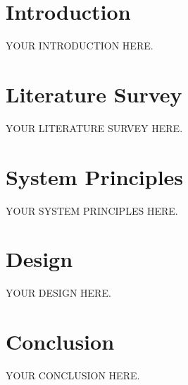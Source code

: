 \documentclass[12pt,a4paper,notitlepage,oneside]{article}
\begin{document}






\tableofcontents
\clearpage
\listoffigures




\clearpage
\section{Introduction}

YOUR INTRODUCTION HERE.
\clearpage


\clearpage
\section{Literature Survey}

YOUR LITERATURE SURVEY HERE.
\clearpage


\clearpage
\section{System Principles}

YOUR SYSTEM PRINCIPLES HERE.
\clearpage


\clearpage
\section{Design}

YOUR DESIGN HERE.
\clearpage


\clearpage
\section{Conclusion}

YOUR CONCLUSION HERE.
\clearpage

{}
\nocite{*}
\printbibliography
\end{document}
